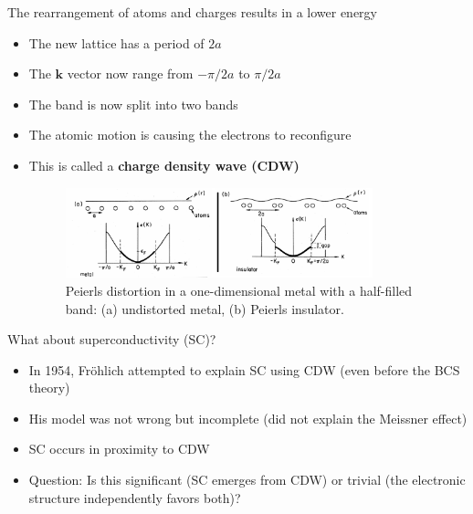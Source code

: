 \documentclass{beamer}
\newcommand*\vf[1]{\mathbf{#1}}
\begin{document}
\begin{frame}{The rearrangement of atoms and charges results in a lower energy}
\begin{itemize}
\item The new lattice has a period of $2a$
\item The $\vf{k}$ vector now range from $-\pi / 2a$ to $\pi / 2a$
\item The band is now split into two bands
\item The atomic motion is causing the electrons to reconfigure
\item This is called a \textbf{charge density wave (CDW)}
\begin{figure}
\includegraphics[width=3.5in]{figs/gap.png}
\caption{\label{fig:gap} Peierls distortion in a one-dimensional metal with a half-filled band: (a) undistorted metal, (b) Peierls insulator.}
\end{figure}
\end{itemize}
\end{frame}

\begin{frame}{What about superconductivity (SC)?}
\begin{itemize}
\item In 1954, Fröhlich attempted to explain SC using CDW (even before the BCS theory)
\item His model was not wrong but incomplete (did not explain the Meissner effect)
\item SC occurs in proximity to CDW
\item Question: Is this significant (SC emerges from CDW) or trivial (the electronic structure independently favors both)?
\end{itemize}
\end{frame}
\end{document}
